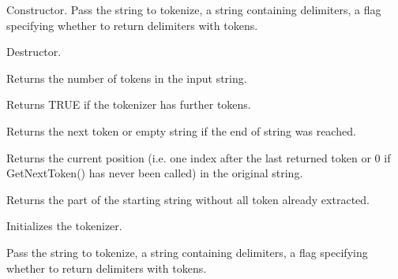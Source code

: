 Constructor. Pass the string to tokenize, a string containing delimiters,
a flag specifying whether to return delimiters with tokens.

\label{wxstringtokenizerdtor}


Destructor.

\label{wxstringtokenizercounttokens}


Returns the number of tokens in the input string.

\label{wxstringtokenizerhasmoretokens}


Returns TRUE if the tokenizer has further tokens.

\label{wxstringtokenizergetnexttoken}


Returns the next token or empty string if the end of string was reached.

\label{wxstringtokenizergetposition}


Returns the current position (i.e. one index after the last returned
token or 0 if GetNextToken() has never been called) in the original
string.

\label{wxstringtokenizergetstring}


Returns the part of the starting string without all token already extracted.

\label{wxstringtokenizersetstring}


Initializes the tokenizer.

Pass the string to tokenize, a string containing delimiters,
a flag specifying whether to return delimiters with tokens.

